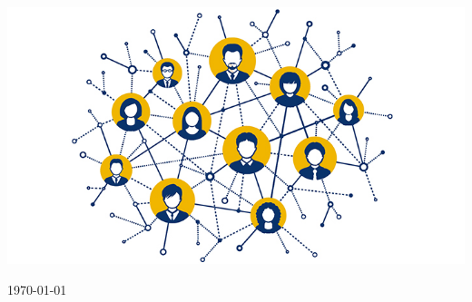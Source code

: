 \begin{titlepage}

	\vspace{1.5cm}
	
	\includegraphics[width=15cm]{../frontespizio/image.jpg}
	
	
		
	
	\vfill\vfill %
	
	{\large\today} %
	
	
	 
	
	\vfill %
	
\end{titlepage}

\clearpage{\pagestyle{empty}\cleardoublepage}
